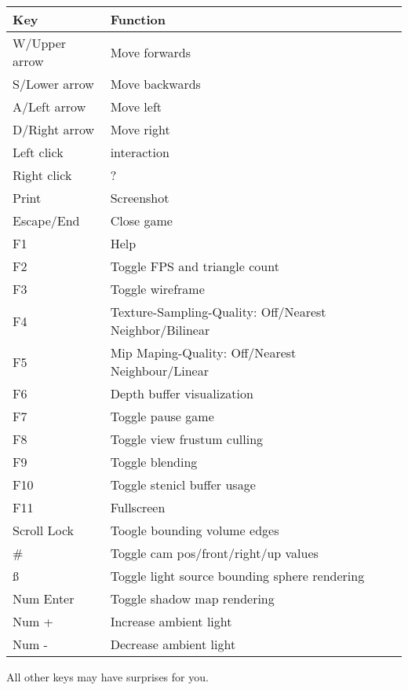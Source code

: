 \documentclass[12pt]{article}
\begin{document}
\begin{table}[h!]
  \centering
  \label{Controls}
  \begin{tabular}{l|l}
    \textbf{Key} & \textbf{Function}\\ \hline
        W/Upper arrow & Move forwards\\ \hline
       	S/Lower arrow & Move backwards\\ \hline
       	A/Left arrow & Move left\\ \hline
       	D/Right arrow & Move right\\ \hline
       	Left click & interaction\\ \hline
       	Right click & ?\\ \hline
       	Print & Screenshot\\ \hline
       	Escape/End & Close game\\ \hline
       	 F1& Help\\ \hline
       	 F2& Toggle FPS and triangle count\\ \hline
       	 F3& Toggle wireframe\\ \hline
       	 F4& Texture-Sampling-Quality: Off/Nearest Neighbor/Bilinear\\ \hline
       	 F5& Mip Maping-Quality: Off/Nearest Neighbour/Linear\\ \hline
       	 F6& Depth buffer visualization\\ \hline
       	 F7& Toggle pause game\\ \hline
       	 F8& Toggle view frustum culling\\ \hline
       	 F9& Toggle blending\\ \hline
       	F10& Toggle stenicl buffer usage\\ \hline
       	F11& Fullscreen\\ \hline
       	Scroll Lock& Toogle bounding volume edges\\ \hline
       	\# & Toggle cam pos/front/right/up values\\ \hline
       	\ss & Toggle light source bounding sphere rendering\\ \hline
       	Num Enter & Toggle shadow map rendering\\ \hline
       	Num + & Increase ambient light\\ \hline
       	Num - & Decrease ambient light\\
  \end{tabular}
\end{table}
All other keys may have surprises for you.
\end{document}
